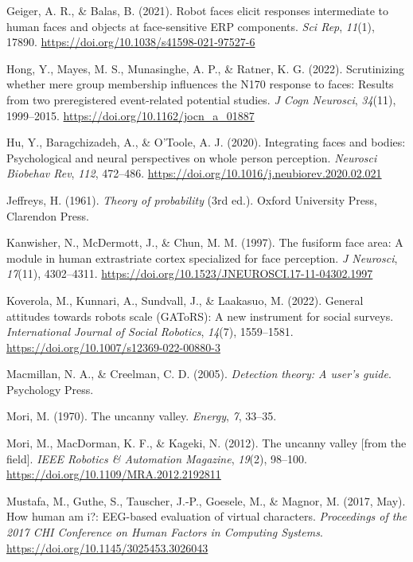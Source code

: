 \documentclass[
]{article}
\newlength{\cslhangindent}
\newenvironment{CSLReferences}[2] %
 {\begin{list}{}{%
  \setlength{\itemindent}{0pt}
  \setlength{\leftmargin}{0pt}
  \setlength{\parsep}{0pt}
  \ifodd #1
   \setlength{\leftmargin}{\cslhangindent}
   \setlength{\itemindent}{-1\cslhangindent}
  \fi
  \setlength{\itemsep}{#2\baselineskip}}}
 {\end{list}}
\begin{document}
\begin{CSLReferences}{1}{0}
Geiger, A. R., \& Balas, B. (2021). Robot faces elicit responses intermediate to human faces and objects at face-sensitive ERP components. \emph{Sci Rep}, \emph{11}(1), 17890. \url{https://doi.org/10.1038/s41598-021-97527-6}

Hong, Y., Mayes, M. S., Munasinghe, A. P., \& Ratner, K. G. (2022). Scrutinizing whether mere group membership influences the N170 response to faces: Results from two preregistered event-related potential studies. \emph{J Cogn Neurosci}, \emph{34}(11), 1999--2015. \url{https://doi.org/10.1162/jocn_a_01887}

Hu, Y., Baragchizadeh, A., \& O'Toole, A. J. (2020). Integrating faces and bodies: Psychological and neural perspectives on whole person perception. \emph{Neurosci Biobehav Rev}, \emph{112}, 472--486. \url{https://doi.org/10.1016/j.neubiorev.2020.02.021}

Jeffreys, H. (1961). \emph{Theory of probability} (3rd ed.). Oxford University Press, Clarendon Press.

Kanwisher, N., McDermott, J., \& Chun, M. M. (1997). The fusiform face area: A module in human extrastriate cortex specialized for face perception. \emph{J Neurosci}, \emph{17}(11), 4302--4311. \url{https://doi.org/10.1523/JNEUROSCI.17-11-04302.1997}

Koverola, M., Kunnari, A., Sundvall, J., \& Laakasuo, M. (2022). General attitudes towards robots scale (GAToRS): A new instrument for social surveys. \emph{International Journal of Social Robotics}, \emph{14}(7), 1559--1581. \url{https://doi.org/10.1007/s12369-022-00880-3}

Macmillan, N. A., \& Creelman, C. D. (2005). \emph{Detection theory: A user's guide}. Psychology Press.

Mori, M. (1970). The uncanny valley. \emph{Energy}, \emph{7}, 33--35.

Mori, M., MacDorman, K. F., \& Kageki, N. (2012). The uncanny valley {[}from the field{]}. \emph{IEEE Robotics \& Automation Magazine}, \emph{19}(2), 98--100. \url{https://doi.org/10.1109/MRA.2012.2192811}

Mustafa, M., Guthe, S., Tauscher, J.-P., Goesele, M., \& Magnor, M. (2017, May). How human am i?: EEG-based evaluation of virtual characters. \emph{Proceedings of the 2017 CHI Conference on Human Factors in Computing Systems}. \url{https://doi.org/10.1145/3025453.3026043}


\end{CSLReferences}
\end{document}
